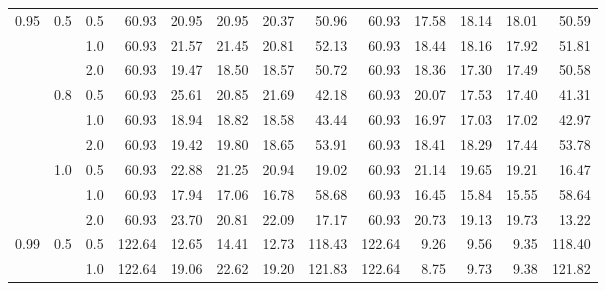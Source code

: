 \documentclass{article}
\begin{document}
{\begin{tabular}{lllrrrrrrrrrr}
     0.95 & 0.5 & 0.5 &   60.93 &       20.95 &                 20.95 &                    20.37 &          50.96 &   60.93 &       17.58 &                 18.14 &                    18.01 &          50.59 \\
          &     & 1.0 &   60.93 &       21.57 &                 21.45 &                    20.81 &          52.13 &   60.93 &       18.44 &                 18.16 &                    17.92 &          51.81 \\
          &     & 2.0 &   60.93 &       19.47 &                 18.50 &                    18.57 &          50.72 &   60.93 &       18.36 &                 17.30 &                    17.49 &          50.58 \\
          & 0.8 & 0.5 &   60.93 &       25.61 &                 20.85 &                    21.69 &          42.18 &   60.93 &       20.07 &                 17.53 &                    17.40 &          41.31 \\
          &     & 1.0 &   60.93 &       18.94 &                 18.82 &                    18.58 &          43.44 &   60.93 &       16.97 &                 17.03 &                    17.02 &          42.97 \\
          &     & 2.0 &   60.93 &       19.42 &                 19.80 &                    18.65 &          53.91 &   60.93 &       18.41 &                 18.29 &                    17.44 &          53.78 \\
          & 1.0 & 0.5 &   60.93 &       22.88 &                 21.25 &                    20.94 &          19.02 &   60.93 &       21.14 &                 19.65 &                    19.21 &          16.47 \\
          &     & 1.0 &   60.93 &       17.94 &                 17.06 &                    16.78 &          58.68 &   60.93 &       16.45 &                 15.84 &                    15.55 &          58.64 \\
          &     & 2.0 &   60.93 &       23.70 &                 20.81 &                    22.09 &          17.17 &   60.93 &       20.73 &                 19.13 &                    19.73 &          13.22 \\
     0.99 & 0.5 & 0.5 &  122.64 &       12.65 &                 14.41 &                    12.73 &         118.43 &  122.64 &        9.26 &                  9.56 &                     9.35 &         118.40 \\
          &     & 1.0 &  122.64 &       19.06 &                 22.62 &                    19.20 &         121.83 &  122.64 &        8.75 &                  9.73 &                     9.38 &         121.82 \\

\end{tabular}}
\end{document}
